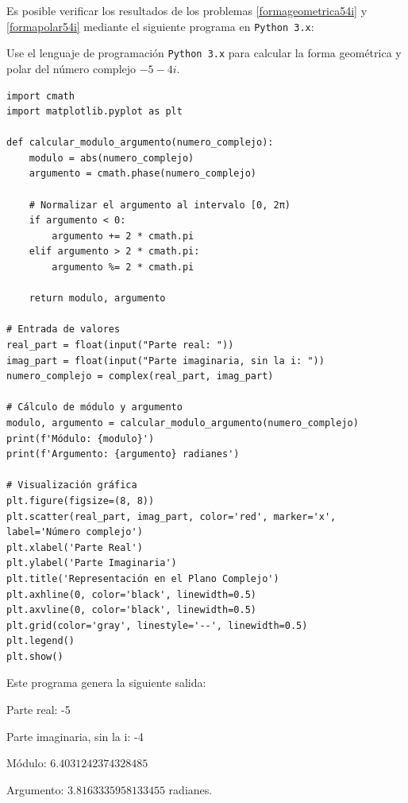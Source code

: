Es posible verificar los resultados de los problemas \ref{formageometrica54i} y \ref{formapolar54i} mediante el siguiente programa en \texttt{Python 3.x}:

\begin{prob} Use el lenguaje de programación \texttt{Python 3.x} para calcular la forma geométrica y polar del número complejo $-5-4i$.
\begin{myproof}
\begin{lstlisting}[label={lst:complejo},basicstyle=\footnotesize]
import cmath
import matplotlib.pyplot as plt

def calcular_modulo_argumento(numero_complejo):
    modulo = abs(numero_complejo)
    argumento = cmath.phase(numero_complejo)
    
    # Normalizar el argumento al intervalo [0, 2π)
    if argumento < 0:
        argumento += 2 * cmath.pi
    elif argumento > 2 * cmath.pi:
        argumento %= 2 * cmath.pi
    
    return modulo, argumento

# Entrada de valores
real_part = float(input("Parte real: "))
imag_part = float(input("Parte imaginaria, sin la i: "))
numero_complejo = complex(real_part, imag_part)

# Cálculo de módulo y argumento
modulo, argumento = calcular_modulo_argumento(numero_complejo)
print(f'Módulo: {modulo}')
print(f'Argumento: {argumento} radianes')

# Visualización gráfica
plt.figure(figsize=(8, 8))
plt.scatter(real_part, imag_part, color='red', marker='x', label='Número complejo')
plt.xlabel('Parte Real')
plt.ylabel('Parte Imaginaria')
plt.title('Representación en el Plano Complejo')
plt.axhline(0, color='black', linewidth=0.5)
plt.axvline(0, color='black', linewidth=0.5)
plt.grid(color='gray', linestyle='--', linewidth=0.5)
plt.legend()
plt.show()
\end{lstlisting}

Este programa genera la siguiente salida:

Parte real: -5

Parte imaginaria, sin la i: -4

Módulo: $6.4031242374328485$

Argumento: $3.8163335958133455$ radianes.


\end{myproof}
\end{prob}
